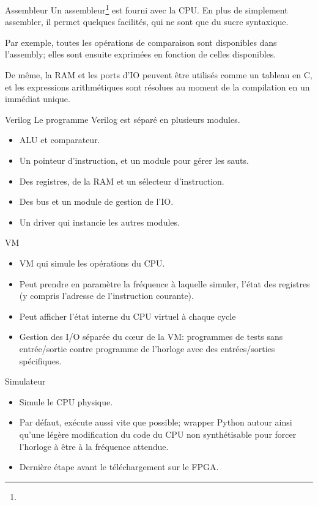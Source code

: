\documentclass{beamer}
\begin{document}
\begin{frame}{Assembleur}
  Un assembleur\footnote{} est fourni avec la CPU. En plus
  de simplement assembler, il permet quelques facilités, qui ne sont
  que du sucre syntaxique.\par
  \pause
  Par exemple, toutes les opérations de comparaison sont disponibles
  dans l'assembly; elles sont ensuite exprimées en fonction de celles
  disponibles.\par
  \pause
  De même, la RAM et les ports d'IO peuvent être utilisés comme un
  tableau en C, et les expressions arithmétiques sont résolues au
  moment de la compilation en un immédiat unique.
\end{frame}

\begin{frame}{Verilog}
  Le programme Verilog est séparé en plusieurs modules.
  \begin{itemize}
  \item ALU et comparateur.
    \pause
  \item Un pointeur d'instruction, et un module pour gérer les sauts.
    \pause
  \item Des registres, de la RAM et un sélecteur d'instruction.
    \pause
  \item Des bus et un module de gestion de l'IO.
    \pause
  \item Un driver qui instancie les autres modules.
  \end{itemize}
\end{frame}

\begin{frame}{VM}
  \begin{itemize}
  \item VM qui simule les opérations du CPU.
    \pause
  \item Peut prendre en paramètre la fréquence à laquelle simuler,
    l'état des registres (y compris l'adresse de l'instruction
    courante).
    \pause
  \item Peut afficher l'état interne du CPU virtuel à chaque cycle
    \pause
  \item Gestion des I/O séparée du c\oe{}ur de la VM: programmes de
    tests sans entrée/sortie contre programme de l'horloge avec des
    entrées/sorties spécifiques.
  \end{itemize}
\end{frame}

\begin{frame}{Simulateur}
  \begin{itemize}
  \item Simule le CPU physique.
    \pause
  \item Par défaut, exécute aussi vite que possible; wrapper Python
    autour ainsi qu'une légère modification du code du CPU non
    synthétisable pour forcer l'horloge à être à la fréquence attendue.
    \pause
  \item Dernière étape avant le téléchargement sur le FPGA.
  \end{itemize}
\end{frame}
\end{document}
